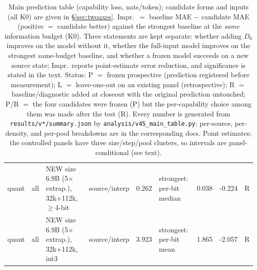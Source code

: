 \begin{table}
\begin{tabular}{@{}llp{4.6cm}lrp{3.2cm}rrl@{}}
\midrule
quant & all & NEW size 6.9B (5$\times$ extrap.), 32k+112k, $\ge$4-bit & source/interp & 0.262 & strongest: per-bit median & 0.038 & -0.224 & R \\
quant & all & NEW size 6.9B (5$\times$ extrap.), 32k+112k, int3 & source/interp & 3.923 & strongest: per-bit mean & 1.865 & -2.057 & R \\
\bottomrule
\end{tabular}
\caption{Main prediction table (capability loss, nats/token); candidate forms and inputs (all K0) are given in \S\ref{sec:twoaxes}. Impr.\ $=$ baseline MAE $-$ candidate MAE (positive $=$ candidate better) against the strongest baseline at the \emph{same} information budget (K0). Three statements are kept separate: whether adding $D_0$ improves on the model without it, whether the full-input model improves on the strongest same-budget baseline, and whether a frozen model succeeds on a new source state; Impr.\ reports point-estimate error reduction, and significance is stated in the text. Status: P $=$ frozen prospective (prediction registered before measurement); L $=$ leave-one-out on an existing panel (retrospective); R $=$ baseline/diagnostic added at closeout with the original prediction untouched; P/R $=$ the four candidates were frozen (P) but the per-capability choice among them was made after the test (R). Every number is generated from \texttt{results/v*/summary.json} by \texttt{analysis/v45\_main\_table.py}; per-source, per-density, and per-pool breakdowns are in the corresponding docs. Point estimates; the controlled panels have three size/step/pool clusters, so intervals are panel-conditional (see text).}
\label{tab:main}
\end{table}
